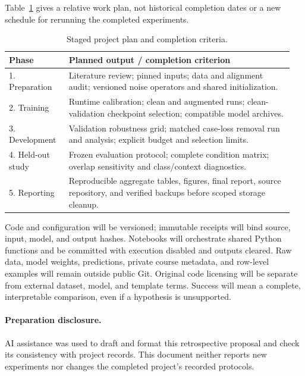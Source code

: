 \documentclass{article}
\begin{document}
Table~\ref{tab:plan} gives a relative work plan, not historical completion dates
or a new schedule for rerunning the completed experiments.
\begin{table}[h]
\caption{Staged project plan and completion criteria.}
\label{tab:plan}
\centering
\small
\begin{tabular}{@{}p{0.20\linewidth}p{0.75\linewidth}@{}}
\toprule
Phase & Planned output / completion criterion \\
\midrule
1. Preparation & Literature review; pinned inputs; data and alignment audit;
versioned noise operators and shared initialization. \\
2. Training & Runtime calibration; clean and augmented runs; clean-validation
checkpoint selection; compatible model archives. \\
3. Development & Validation robustness grid; matched case-loss removal run and
analysis; explicit budget and selection limits. \\
4. Held-out study & Frozen evaluation protocol; complete condition matrix;
overlap sensitivity and class/context diagnostics. \\
5. Reporting & Reproducible aggregate tables, figures, final report, source
repository, and verified backups before scoped storage cleanup. \\
\bottomrule
\end{tabular}
\end{table}

Code and configuration will be versioned; immutable receipts will bind source,
input, model, and output hashes. Notebooks will orchestrate shared Python
functions and be committed with execution disabled and outputs cleared.
Raw data, model weights, predictions, private course metadata, and row-level
examples will remain outside public Git. Original code licensing will be
separate from external dataset, model, and template terms. Success will mean
a complete, interpretable comparison, even if a hypothesis is unsupported.

\paragraph{Preparation disclosure.}
AI assistance was used to draft and format this retrospective proposal and
check its consistency with project records. This document neither reports
new experiments nor changes the completed project's recorded protocols.
\end{document}
